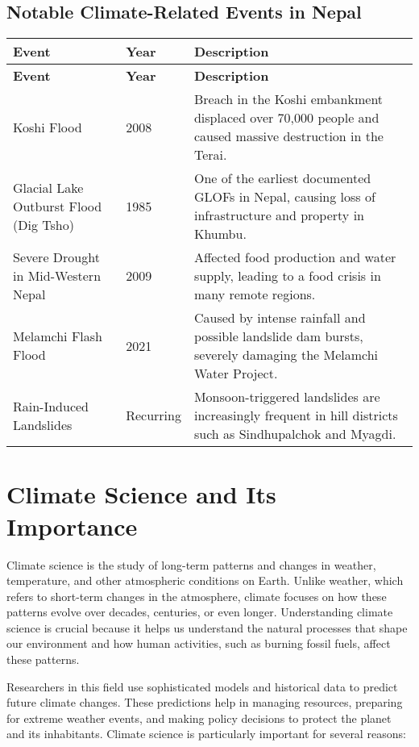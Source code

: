 \subsection*{Notable Climate-Related Events in Nepal}

\begin{longtable}{|p{4cm}|p{2cm}|p{8cm}|}
\hline
\textbf{Event} & \textbf{Year} & \textbf{Description} \\
\hline
\endfirsthead

\hline
\textbf{Event} & \textbf{Year} & \textbf{Description} \\
\hline
\endhead

Koshi Flood & 2008 & Breach in the Koshi embankment displaced over 70,000 people and caused massive destruction in the Terai. \\
\hline
Glacial Lake Outburst Flood (Dig Tsho) & 1985 & One of the earliest documented GLOFs in Nepal, causing loss of infrastructure and property in Khumbu. \\
\hline
Severe Drought in Mid-Western Nepal & 2009 & Affected food production and water supply, leading to a food crisis in many remote regions. \\
\hline
Melamchi Flash Flood & 2021 & Caused by intense rainfall and possible landslide dam bursts, severely damaging the Melamchi Water Project. \\
\hline
Rain-Induced Landslides & Recurring & Monsoon-triggered landslides are increasingly frequent in hill districts such as Sindhupalchok and Myagdi. \\
\hline
\end{longtable}
\captionsetup{justification=centering}

\section*{Climate Science and Its Importance}

Climate science is the study of long-term patterns and changes in weather, temperature, and other atmospheric conditions on Earth. Unlike weather, which refers to short-term changes in the atmosphere, climate focuses on how these patterns evolve over decades, centuries, or even longer. Understanding climate science is crucial because it helps us understand the natural processes that shape our environment and how human activities, such as burning fossil fuels, affect these patterns.

Researchers in this field use sophisticated models and historical data to predict future climate changes. These predictions help in managing resources, preparing for extreme weather events, and making policy decisions to protect the planet and its inhabitants. Climate science is particularly important for several reasons:


